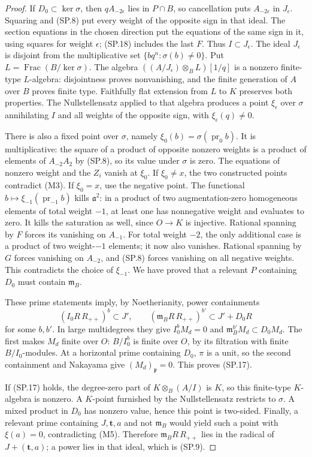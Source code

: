 \begin{proof}
If $D_0\subset\ker\sigma$, then $qA_{-2\epsilon}$ lies in
$P\cap B$, so cancellation puts $A_{-2\epsilon}$ in
$J_\epsilon$.  Squaring and (SP.8) put every weight of the opposite
sign in that ideal.  The section equations in the chosen direction
put the equations of the same sign in it, using squares for weight
$\epsilon$; (SP.18) includes the last $F$.  Thus
$I\subset J_\epsilon$.
The ideal $J_\epsilon$ is disjoint from the multiplicative set
$\{bq^n:\sigma(b)\ne0\}$.  Put
$L=\operatorname{Frac}(B/\ker\sigma)$.
The algebra $((A/J_\epsilon)\otimes_B L)[1/q]$ is a nonzero
finite-type $L$-algebra: disjointness proves nonvanishing, and the
finite generation of $A$ over $B$ proves finite type.
Faithfully flat extension from $L$ to $K$ preserves both properties.
The Nullstellensatz applied to that algebra produces a point
$\xi_\epsilon$ over $\sigma$
annihilating $I$ and all weights of the opposite sign, with
$\xi_\epsilon(q)\ne0$.

There is also a fixed point over $\sigma$, namely
$\xi_0(b)=\sigma(\operatorname{pr}_0b)$.  It is multiplicative:
the square of a product of opposite nonzero weights is a product of
elements of $A_{-2}A_2$ by (SP.8), so its value under $\sigma$ is
zero.  The equations of nonzero weight and the $Z_i$ vanish at
$\xi_0$.  If $\xi_0\ne x$, the two constructed points contradict
(M3).  If $\xi_0=x$, use the negative point.  The functional
$b\mapsto\xi_{-1}(\operatorname{pr}_{-1}b)$ kills
$\mathfrak a^2$: in a product of two augmentation-zero homogeneous
elements of total weight $-1$, at least one has nonnegative weight
and evaluates to zero.  It kills the saturation as well, since
$O\to K$ is injective.  Rational spanning by $F$ forces its
vanishing on $A_{-1}$.  For total weight $-2$, the only additional
case is a product of two weight-$-1$ elements; it now also vanishes.
Rational spanning by $G$ forces vanishing on $A_{-2}$, and (SP.8)
forces vanishing on all negative weights.  This contradicts the
choice of $\xi_{-1}$.  We have proved that a relevant $P$ containing
$D_0$ must contain $\mathfrak m_B$.

These prime statements imply, by Noetherianity, power containments
\[
 (I_0R\,R_{++})^b\subset J',\qquad
 (\mathfrak m_BR\,R_{++})^{b'}\subset J'+D_0R
 \tag{SP.21}
\]
for some $b,b'$.  In large multidegrees they give
$I_0^bM_d=0$ and $\mathfrak m_B^{b'}M_d\subset D_0M_d$.
The first makes $M_d$ finite over $O$: $B/I_0^b$ is finite over
$O$, by its filtration with finite $B/I_0$-modules.  At a horizontal
prime containing $D_0$, $\pi$ is a unit, so the second containment
and Nakayama give $(M_d)_{\mathfrak p}=0$.  This proves (SP.17).

If (SP.17) holds, the degree-zero part of
$K\otimes_B(A/I)$ is $K$, so this finite-type $K$-algebra is
nonzero.  A $K$-point furnished by the Nullstellensatz restricts to
$\sigma$.  A mixed product in $D_0$ has nonzero value, hence this
point is two-sided.  Finally, a relevant prime containing
$J,\mathbf t,a$ and not $\mathfrak m_B$ would yield such a point
with $\xi(a)=0$, contradicting (M5).  Therefore
$\mathfrak m_BR\,R_{++}$ lies in the radical of $J+(\mathbf t,a)$;
a power lies in that ideal, which is (SP.9).
\end{proof}

